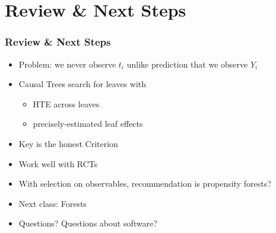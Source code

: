 \documentclass[
  shownotes,
  xcolor={svgnames},
  hyperref={colorlinks,citecolor=DarkBlue,linkcolor=DarkRed,urlcolor=DarkBlue}
  , aspectratio=169]{beamer}
\begin{document}
\section{Review
 \& Next Steps}
\begin{frame}
\frametitle{Review \& Next Steps}
  
\begin{itemize} 
    \item Problem: we never observe $t_i$ unlike prediction that we observe $Y_i$
    \medskip
    \item Causal Trees search for leaves with
    \begin{itemize}
      \item HTE across leaves
      \item precisely-estimated leaf effects
    \end{itemize}
    \item Key is the honest Criterion
    \medskip
    \item Work well with RCTs
    \medskip
    \item  With selection on observables, recommendation is propensity forests?
    \medskip  
    \item  Next class:  Forests
    \medskip  
    \item Questions? Questions about software? 

\end{itemize}
\end{frame}
\end{document}
